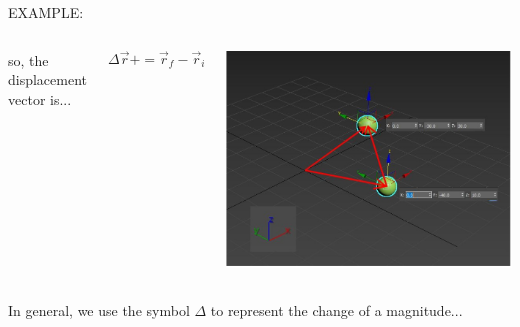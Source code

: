 \documentclass[]{beamer}
\begin{document}
  \begin{frame}
  
  
  EXAMPLE:
  
  
  
  
  
  
  
  \begin{columns}
  
  so, the displacement vector is...
  
  \begin{equation}
  \Delta \vec{ r}+=\vec{r}_f-\vec{r}_i
  \end{equation}
  
  
  
  \begin{center}
       \includegraphics[width=1.1\textwidth]{images/exampleVS5.jpg}      
       \end{center}
  
  
  \end{columns}
  
  
  
  
   \end{frame}
  
  



\begin{frame}


In general, we use the symbol $\Delta$ to represent the change of a magnitude...




 \end{frame}
\end{document}
